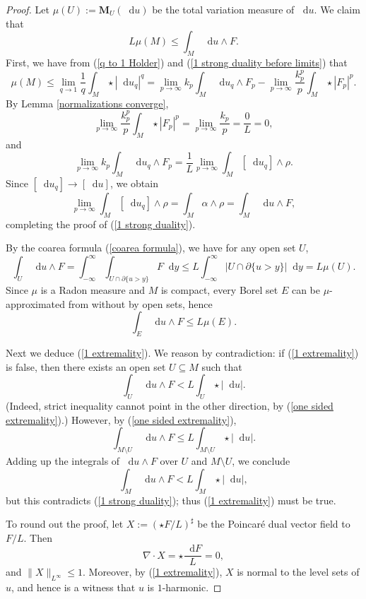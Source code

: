 \documentclass[reqno,11pt]{amsart}
\newcommand*\dif{\mathop{}\!\mathrm{d}}
\newcommand{\Mass}{\mathbf M}
\theoremstyle{definition}
\numberwithin{equation}{section}
\begin{document}
\begin{proof}
Let $\mu(U) := \Mass_U(\dif u)$ be the total variation measure of $\dif u$.
We claim that
\begin{equation}\label{1 strong duality}
	L\mu(M) \leq \int_M \dif u \wedge F.
\end{equation}
First, we have from (\ref{q to 1 Holder}) and (\ref{1 strong duality before limits}) that
$$\mu(M) \leq \lim_{q \to 1} \frac{1}{q} \int_M \star |\dif u_q|^q = \lim_{p \to \infty} k_p \int_M \dif u_q \wedge F_p - \lim_{p \to \infty} \frac{k_p^p}{p} \int_M \star |F_p|^p.$$
By Lemma \ref{normalizations converge},
$$\lim_{p \to \infty} \frac{k_p^p}{p} \int_M \star |F_p|^p = \lim_{p \to \infty} \frac{k_p}{p} = \frac{0}{L} = 0,$$
and
$$\lim_{p \to \infty} k_p \int_M \dif u_q \wedge F_p = \frac{1}{L} \lim_{p \to \infty} \int_M [\dif u_q] \wedge \rho.$$
Since $[\dif u_q] \to [\dif u]$, we obtain
$$\lim_{p \to \infty} \int_M [\dif u_q] \wedge \rho = \int_M \alpha \wedge \rho = \int_M \dif u \wedge F,$$
completing the proof of (\ref{1 strong duality}).

By the coarea formula (\ref{coarea formula}), we have for any open set $U$,
$$\int_U \dif u \wedge F = \int_{-\infty}^\infty \int_{U \cap \partial \{u > y\}} F \dif y \leq L \int_{-\infty}^\infty |U \cap \partial \{u > y\}| \dif y = L \mu(U).$$
Since $\mu$ is a Radon measure and $M$ is compact, every Borel set $E$ can be $\mu$-approximated from without by open sets, hence
\begin{equation}\label{one sided extremality}
\int_E \dif u \wedge F \leq L \mu(E).
\end{equation}

Next we deduce (\ref{1 extremality}).
We reason by contradiction: if (\ref{1 extremality}) is false, then there exists an open set $U \subseteq M$ such that 
$$\int_U \dif u \wedge F < L \int_U \star |\dif u|.$$
(Indeed, strict inequality cannot point in the other direction, by (\ref{one sided extremality}).)
However, by (\ref{one sided extremality}), 
$$\int_{M \setminus U} \dif u \wedge F \leq L \int_{M \setminus U} \star |\dif u|.$$
Adding up the integrals of $\dif u \wedge F$ over $U$ and $M \setminus U$, we conclude 
$$\int_M \dif u \wedge F < L \int_M \star |\dif u|,$$
but this contradicts (\ref{1 strong duality}); thus (\ref{1 extremality}) must be true.

To round out the proof, let $X := (\star F/L)^\sharp$ be the Poincar\'e dual vector field to $F/L$. Then
$$\nabla \cdot X = \star \frac{\dif F}{L} = 0,$$
and $\|X\|_{L^\infty} \leq 1$.
Moreover, by (\ref{1 extremality}), $X$ is normal to the level sets of $u$, and hence is a witness that $u$ is $1$-harmonic.
\end{proof}
\end{document}
